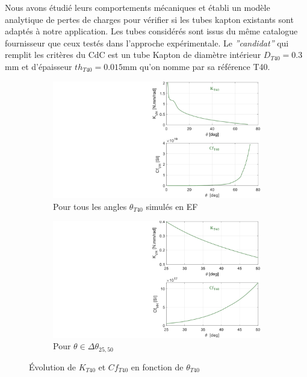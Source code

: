 Nous avons étudié leurs comportements mécaniques et établi un modèle analytique de pertes de charges pour vérifier si les tubes kapton existants sont adaptés à notre application. Les tubes considérés sont issus du même catalogue fournisseur que ceux testés dans l'approche expérimentale. Le \emph{''candidat''} qui remplit les critères du CdC est un tube Kapton de diamètre intérieur $D_{T40}=0.3$mm et d'épaisseur $th_{T40}=0.015$mm qu'on nomme par sa référence T40.
\begin{figure}[!htbp]
	\begin{center}
		\begin{subfigure}[b]{0.48\textwidth}
			\captionsetup{justification=centering}
			\includegraphics[trim={16cm 0cm 0cm 0cm},clip,width=\textwidth]{../Chap5/Figure/(K_VH)_(Cf_VH)_vs_theta.pdf}
			\caption{Pour tous les angles $\theta_{T40}$ simulés en EF}
			\label{fig:(K_VH)_(Cf_VH)_vs_theta}
		\end{subfigure}
		\hfillx
		\begin{subfigure}[b]{0.48\textwidth}
			\captionsetup{justification=centering}
			\includegraphics[trim={16cm 0cm 0cm 0cm},clip,width=\textwidth]{../Chap5/Figure/(K_VH)_(Cf_VH)_vs_theta_25-50.pdf}
			\caption{Pour $\theta \in \Delta \theta _{25,50}$}
			\label{fig:(K_VH)_(Cf_VH)_vs_theta_CdC}
		\end{subfigure}
		\caption{Évolution de $K_{T40}$ et $Cf_{T40}$ en fonction de $\theta_{T40}$}
		\label{fig:K_T40 et Cf_T40}
	\end{center}
\end{figure}

